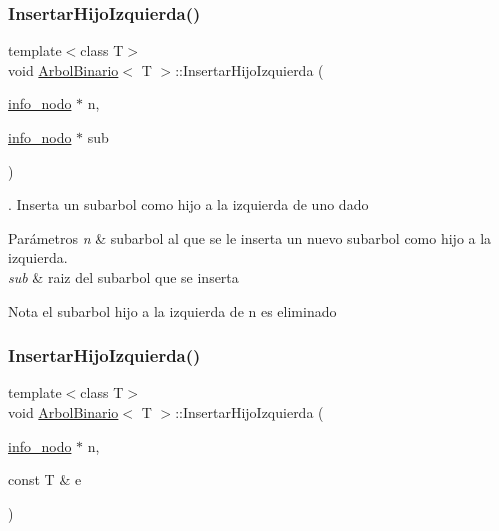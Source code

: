 \subsubsection{\texorpdfstring{Insertar\+Hijo\+Izquierda()}{InsertarHijoIzquierda()}\hspace{0.1cm}{\footnotesize\ttfamily [1/2]}}
{\footnotesize\ttfamily template$<$class T$>$ \\
void \hyperlink{classArbolBinario}{Arbol\+Binario}$<$ T $>$\+::Insertar\+Hijo\+Izquierda (\begin{DoxyParamCaption}\item[{\hyperlink{structArbolBinario_1_1info__nodo}{info\+\_\+nodo} $\ast$}]{n,  }\item[{\hyperlink{structArbolBinario_1_1info__nodo}{info\+\_\+nodo} $\ast$}]{sub }\end{DoxyParamCaption})\hspace{0.3cm}{\ttfamily [private]}}



. Inserta un subarbol como hijo a la izquierda de uno dado 


\begin{DoxyParams}{Parámetros}
{\em n} & subarbol al que se le inserta un nuevo subarbol como hijo a la izquierda. \\
\hline
{\em sub} & raiz del subarbol que se inserta \\
\hline
\end{DoxyParams}
\begin{DoxyNote}{Nota}
el subarbol hijo a la izquierda de n es eliminado 
\end{DoxyNote}
\mbox{\label{classArbolBinario_a87341ffccfe5ef304783c70adf86238d}} 
\subsubsection{\texorpdfstring{Insertar\+Hijo\+Izquierda()}{InsertarHijoIzquierda()}\hspace{0.1cm}{\footnotesize\ttfamily [2/2]}}
{\footnotesize\ttfamily template$<$class T$>$ \\
void \hyperlink{classArbolBinario}{Arbol\+Binario}$<$ T $>$\+::Insertar\+Hijo\+Izquierda (\begin{DoxyParamCaption}\item[{\hyperlink{structArbolBinario_1_1info__nodo}{info\+\_\+nodo} $\ast$}]{n,  }\item[{const T \&}]{e }\end{DoxyParamCaption})\hspace{0.3cm}{\ttfamily [private]}}



